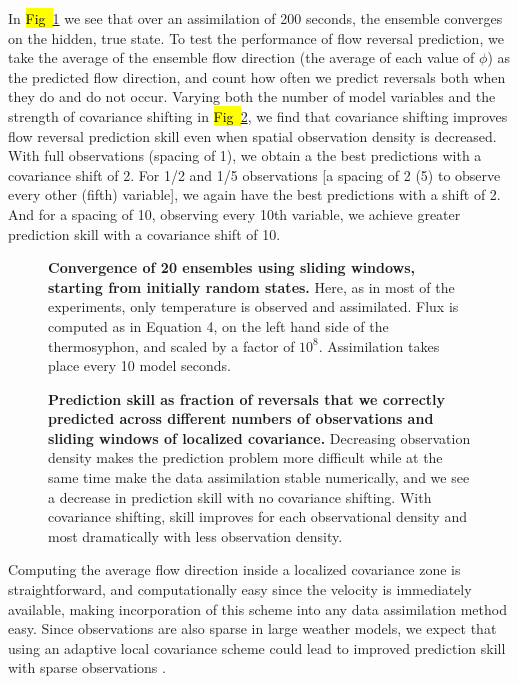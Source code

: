 \documentclass[10pt,letterpaper]{article}
\begin{document}
In \hl{Fig~}\ref{fig:sliding_spag} we see that over an assimilation of 200 seconds, the ensemble converges on the hidden, true state.
To test the performance of flow reversal prediction, we take the average of the ensemble flow direction (the average of each value of $\phi$) as the predicted flow direction, and count how often we predict reversals both when they do and do not occur.
Varying both the number of model variables and the strength of covariance shifting in \hl{Fig~}\ref{fig:sliding_results}, we find that covariance shifting improves flow reversal prediction skill even when spatial observation density is decreased.
With full observations (spacing of 1), we obtain a the best predictions with a covariance shift of 2.
For 1/2 and 1/5 observations [a spacing of 2 (5) to observe every other (fifth) variable], we again have the best predictions with a shift of 2.
And for a spacing of 10, observing every 10th variable, we achieve greater prediction skill with a covariance shift of 10.

\begin{figure}[h]
  \centering
  \caption[]{
\textbf{    Convergence of 20 ensembles using sliding windows, starting from initially random states.
}    Here, as in most of the experiments, only temperature is observed and assimilated.
    Flux is computed as in Equation 4, on the left hand side of the thermosyphon, and scaled by a factor of $10^8$.
    Assimilation takes place every 10 model seconds.
  }
  \label{fig:sliding_spag}
\end{figure}

\begin{figure}[h]
  \centering
  \caption[]{
\textbf{    Prediction skill as fraction of reversals that we correctly predicted across different numbers of observations and sliding windows of localized covariance.
}    Decreasing observation density makes the prediction problem more difficult while at the same time make the data assimilation stable numerically, and we see a decrease in prediction skill with no covariance shifting.
    With covariance shifting, skill improves for each observational density and most dramatically with less observation density.
  }
  \label{fig:sliding_results}
\end{figure}

Computing the average flow direction inside a localized covariance zone is straightforward, and computationally easy since the velocity is immediately available, making incorporation of this scheme into any data assimilation method easy.
Since observations are also sparse in large weather models, we expect that using an adaptive local covariance scheme could lead to improved prediction skill with sparse observations \cite{bishop2011a}.
\end{document}
